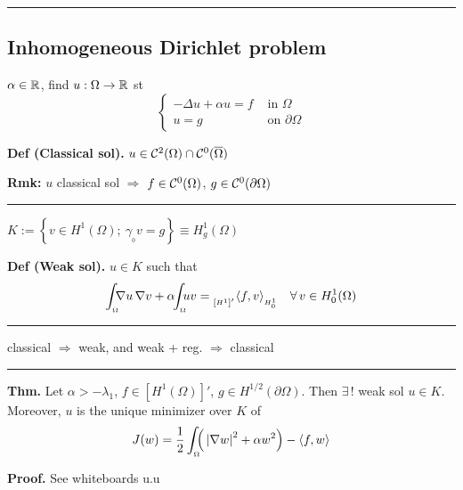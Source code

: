 \rule{0.31\textwidth}{0.2pt}


\subsection{\texorpdfstring{\color{red}Inhomogeneous Dirichlet problem}{}}


$\alpha\in\mathbb{R}$, find $u:\Omega\to\mathbb{R}$ st
\begin{equation*}
\begin{cases}
    -\Delta u +\alpha u = f &\text{ in }\Omega\\
    u=g &\text{ on }\partial\Omega    
\end{cases}
\end{equation*}

\textbf{Def (Classical sol).} $u\in\mathcal{C}^2(\Omega)\cap\mathcal{C}^0(\overline{\Omega})$

\smallskip

\textbf{Rmk:} $u$ classical sol $\Rightarrow$ $f\in\mathcal{C}^0(\Omega)$, $g\in\mathcal{C}^0(\partial\Omega)$

\rule{0.31\textwidth}{0.2pt}
\smallskip

$K:=\left\{ v\in H^1(\Omega);\ \gamma_{_0}v=g \right\}\equiv H^1_g(\Omega)$

\smallskip

\textbf{Def (Weak sol).} $u\in K$ such that
\begin{equation*}
\int_{_\Omega}\!\!\! \nabla u\,\nabla v +\alpha\!\!\int_{_\Omega}\!\!\! uv ={}_{_{\left[H^1\right]'}}\!\sca{f,v}{\!}_{_{H^1_0}}\quad\forall\, v\in H^1_0(\Omega)
\end{equation*}

\rule{0.31\textwidth}{0.2pt}
\smallskip

classical $\Rightarrow$ weak, and weak + reg. $\Rightarrow$ classical

\rule{0.31\textwidth}{0.2pt}
\smallskip

\textbf{Thm.} Let $\alpha> -\lambda_1$, $f\in\left[ H^1(\Omega) \right]'$, $g\in H^{1/2}(\partial\Omega)$. Then $\exists\,!$ weak sol $u\in K$. Moreover, $u$ is the unique minimizer over $K$ of 
\begin{equation*}
J(w)=\frac{1}{2}\int_{_\Omega}\!\!\!  \Big( \left| \nabla w \right|^2+\alpha w^2 \Big)-\left\langle f,w \right\rangle
\end{equation*}

\textbf{\color{lavender(floral)}Proof.} See whiteboards u.u

